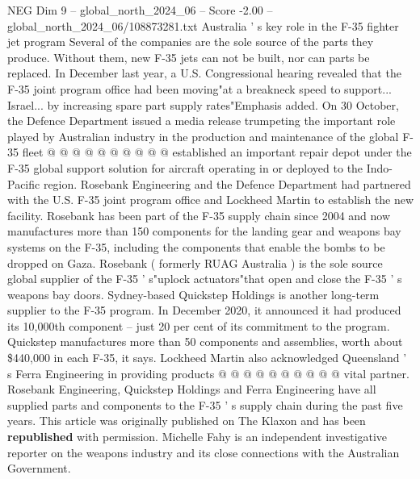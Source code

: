 \begin{textsample}{NEG Dim 9 – global\_north\_2024\_06 – Score -2.00 – global\_north\_2024\_06/108873281.txt}
Australia ' s key role in the F-35 fighter jet program Several of the companies are the sole source of the parts they produce.
Without them, new F-35 jets can not be built, nor can parts be replaced.
In December last year, a U.S.
Congressional hearing revealed that the F-35 joint program office had been moving"at a breakneck speed to support...
Israel... by increasing spare part supply rates"Emphasis added.
On 30 October, the Defence Department issued a media release trumpeting the important role played by Australian industry in the production and maintenance of the global F-35 fleet @ @ @ @ @ @ @ @ @ @ established an important repair depot under the F-35 global support solution for aircraft operating in or deployed to the Indo-Pacific region.
Rosebank Engineering and the Defence Department had partnered with the U.S.
F-35 joint program office and Lockheed Martin to establish the new facility.
Rosebank has been part of the F-35 supply chain since 2004 and now manufactures more than 150 components for the landing gear and weapons bay systems on the F-35, including the components that enable the bombs to be dropped on Gaza.
Rosebank ( formerly RUAG Australia ) is the sole source global supplier of the F-35 ' s"uplock actuators"that open and close the F-35 ' s weapons bay doors.
Sydney-based Quickstep Holdings is another long-term supplier to the F-35 program.
In December 2020, it announced it had produced its 10,000th component -- just 20 per cent of its commitment to the program.
Quickstep manufactures more than 50 components and assemblies, worth about \$440,000 in each F-35, it says.
Lockheed Martin also acknowledged Queensland ' s Ferra Engineering in providing products @ @ @ @ @ @ @ @ @ @ vital partner.
Rosebank Engineering, Quickstep Holdings and Ferra Engineering have all supplied parts and components to the F-35 ' s supply chain during the past five years.
This article was originally published on The Klaxon and has been \textbf{republished} with permission.
Michelle Fahy is an independent investigative reporter on the weapons industry and its close connections with the Australian Government.

\end{textsample}
